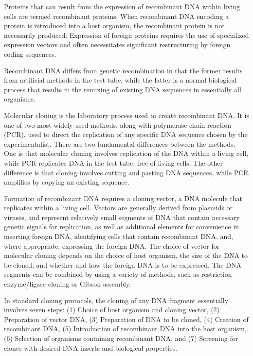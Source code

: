 Proteins that can result from the expression of recombinant DNA within living cells are termed recombinant proteins. When recombinant DNA encoding a protein is introduced into a host organism, the recombinant protein is not necessarily produced. Expression of foreign proteins requires the use of specialized expression vectors and often necessitates significant restructuring by foreign coding sequences.

Recombinant DNA differs from genetic recombination in that the former results from artificial methods in the test tube, while the latter is a normal biological process that results in the remixing of existing DNA sequences in essentially all organisms.

Molecular cloning is the laboratory process used to create recombinant DNA. It is one of two most widely used methods, along with polymerase chain reaction (PCR), used to direct the replication of any specific DNA sequence chosen by the experimentalist. There are two fundamental differences between the methods. One is that molecular cloning involves replication of the DNA within a living cell, while PCR replicates DNA in the test tube, free of living cells. The other difference is that cloning involves cutting and pasting DNA sequences, while PCR amplifies by copying an existing sequence.

Formation of recombinant DNA requires a cloning vector, a DNA molecule that replicates within a living cell. Vectors are generally derived from plasmids or viruses, and represent relatively small segments of DNA that contain necessary genetic signals for replication, as well as additional elements for convenience in inserting foreign DNA, identifying cells that contain recombinant DNA, and, where appropriate, expressing the foreign DNA. The choice of vector for molecular cloning depends on the choice of host organism, the size of the DNA to be cloned, and whether and how the foreign DNA is to be expressed. The DNA segments can be combined by using a variety of methods, such as restriction enzyme/ligase cloning or Gibson assembly.

In standard cloning protocols, the cloning of any DNA fragment essentially involves seven steps: (1) Choice of host organism and cloning vector, (2) Preparation of vector DNA, (3) Preparation of DNA to be cloned, (4) Creation of recombinant DNA, (5) Introduction of recombinant DNA into the host organism, (6) Selection of organisms containing recombinant DNA, and (7) Screening for clones with desired DNA inserts and biological properties.

